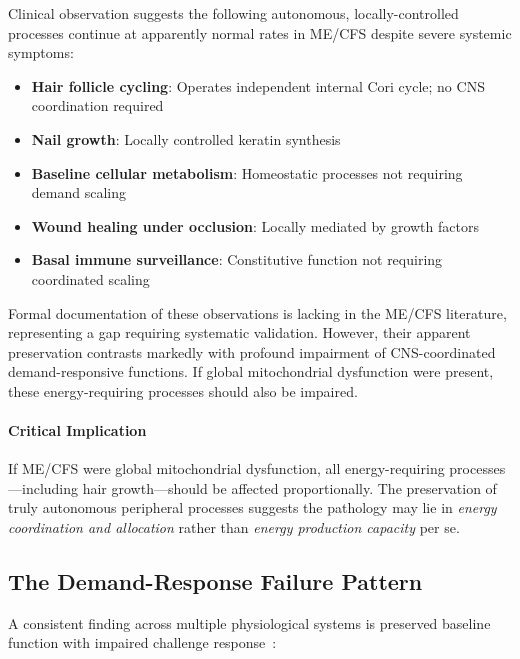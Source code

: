\begin{observation}
\label{obs:preserved-autonomous}
Clinical observation suggests the following autonomous, locally-controlled processes continue at apparently normal rates in ME/CFS despite severe systemic symptoms:
\begin{itemize}
    \item \textbf{Hair follicle cycling}: Operates independent internal Cori cycle; no CNS coordination required
    \item \textbf{Nail growth}: Locally controlled keratin synthesis
    \item \textbf{Baseline cellular metabolism}: Homeostatic processes not requiring demand scaling
    \item \textbf{Wound healing under occlusion}: Locally mediated by growth factors
    \item \textbf{Basal immune surveillance}: Constitutive function not requiring coordinated scaling
\end{itemize}
Formal documentation of these observations is lacking in the ME/CFS literature, representing a gap requiring systematic validation. However, their apparent preservation contrasts markedly with profound impairment of CNS-coordinated demand-responsive functions. If global mitochondrial dysfunction were present, these energy-requiring processes should also be impaired.
\end{observation}

\paragraph{Critical Implication}
If ME/CFS were global mitochondrial dysfunction, all energy-requiring processes---including hair growth---should be affected proportionally. The preservation of truly autonomous peripheral processes suggests the pathology may lie in \emph{energy coordination and allocation} rather than \emph{energy production capacity} per se.

\subsection{The Demand-Response Failure Pattern}

A consistent finding across multiple physiological systems is preserved baseline function with impaired challenge response~\cite{VanCampenEtAl2020,VanCampenEtAl2024,keller2024cpet}:

